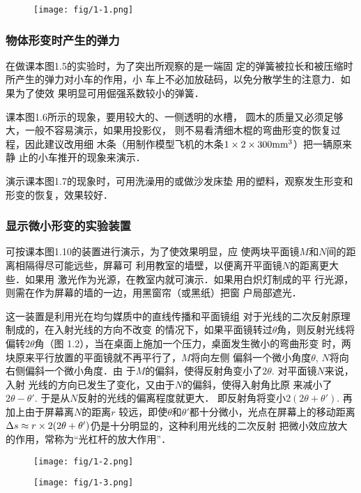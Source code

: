 \begin{figure}[htp]
    \centering
\texttt{[image: fig/1-1.png]}
    \caption{}
\end{figure}


\subsubsection{物体形变时产生的弹力}
在做课本图1.5的实验时，为了突出所观察的是一端固
定的弹簧被拉长和被压缩时所产生的弹力对小车的作用，小
车上不必加放砝码，以免分散学生的注意力．如果为了使效
果明显可用倔强系数较小的弹簧．

课本图1.6所示的现象，要用较大的、一侧透明的水槽，
圆木的质量又必须足够大，一般不容易演示，如果用投影仪，
则不易看清细木棍的弯曲形变的恢复过程，因此建议改用细
木条（用制作模型飞机的木条$1\times2\times300 {\rm mm}^3$）把一辆原来静
止的小车推开的现象来演示．

演示课本图1.7的现象时，可用洗澡用的或做沙发床垫
用的塑料，观察发生形变和形变的恢复，效果较好．

\subsubsection{显示微小形变的实验装置}
可按课本图1.10的装置进行演示，为了使效果明显，应
使两块平面镜$M$和$N$间的距离相隔得尽可能远些，屏幕可
利用教室的墙壁，以便离开平面镜$N$的距离更大些．如果用
激光作为光源，在教室内就可演示．如果用白炽灯制成的平
行光源，则需在作为屏幕的墙的一边，用黑窗帘（或黑纸）把窗
户局部遮光．

这一装置是利用光在均匀媒质中的直线传播和平面镜组
对于光线的二次反射原理制成的，在入射光线的方向不改变
的情况下，如果平面镜转过$\theta$角，则反射光线将偏转$2\theta$角（图
1.2），当在桌面上施加一个压力，桌面发生微小的弯曲形变
时，两块原来平行放置的平面镜就不再平行了，$M$将向左侧
偏斜一个微小角度$\theta$, $N$将向右侧偏斜一个微小角度．由
于$M$的偏斜，使得反射角变小了$2\theta$. 对平面镜$N$来说，入射
光线的方向已发生了变化，又由于$N$的偏斜，使得入射角比原
来减小了$2\theta- \theta'$. 于是从$N$反射的光线的偏离程度就更大．
即反射角将变小$2(2\theta+\theta')$. 再加上由于屏幕离$N$的距离$r$
较远，即使$\theta$和$\theta'$都十分微小，光点在屏幕上的移动距离$\Delta s\approx r\times 2(2\theta+\theta')$仍是十分明显的，这种利用光线的二次反射
把微小效应放大的作用，常称为“光杠杆的放大作用”．
\begin{figure}[htp]\centering
    \begin{minipage}[t]{0.48\textwidth}
    \centering
\texttt{[image: fig/1-2.png]}
    \caption{}
    \end{minipage}
    \begin{minipage}[t]{0.48\textwidth}
    \centering
    \texttt{[image: fig/1-3.png]}
    \caption{}
    \end{minipage}
    \end{figure}

